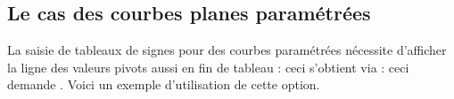 \documentclass[12pt, a4paper]{article}
\begin{document}

\subsection{Le cas des courbes planes paramétrées}

La saisie de tableaux de signes pour des courbes paramétrées nécessite d'afficher la ligne des valeurs pivots aussi en fin de tableau : ceci s'obtient via  : ceci demande . Voici un exemple d'utilisation de cette option. 
\end{document}
